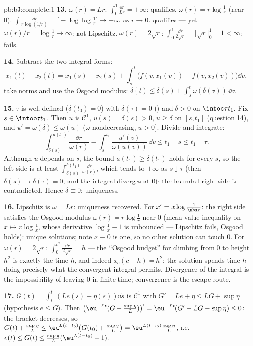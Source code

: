 \begin{solution}{pb:b3:complete:1}
\textbf{13.} $\omega(r) = Lr$: $\int_0^1\frac{\dd r}{Lr} =
+\infty$: qualifies. $\omega(r) = r\log\frac1r$ (near $0$):
$\int\frac{\dd r}{r\log(1/r)} = \bigl[-\log\log\frac1r\bigr]
\to +\infty$ as $r \to 0$: qualifies --- yet $\omega(r)/r =
\log\frac1r \to \infty$: not Lipschitz. $\omega(r) = 2\sqrt
r$: $\int_0^1\frac{\dd r}{2\sqrt r} = \bigl[\sqrt r\bigr]_0^1
= 1 < \infty$: fails.

\textbf{14.} Subtract the two integral forms:
\[
x_1(t) - x_2(t) = x_1(s) - x_2(s) + \int_s^t\bigl(f(v,
x_1(v)) - f(v, x_2(v))\bigr)\dd v,
\]
take norms and use the Osgood modulus: $\delta(t) \leq
\delta(s) + \int_s^t\omega(\delta(v))\,\dd v$.

\textbf{15.} $\tau$ is well defined ($\delta(t_0) = 0$) with
$\delta(\tau) = 0$ () and $\delta > 0$ on
$\intoc\tau{t_1}$. Fix $s \in \intoo\tau{t_1}$. Then $u$ is
$\mathcal C^1$, $u(s) = \delta(s) > 0$, $u \geq \delta$ on
$[s, t_1]$ (question 14), and $u' = \omega(\delta) \leq
\omega(u)$ ($\omega$ nondecreasing, $u > 0$). Divide and
integrate:
\[
\int_{\delta(s)}^{u(t_1)}\frac{\dd r}{\omega(r)}
= \int_s^{t_1}\frac{u'(v)}{\omega(u(v))}\,\dd v \leq t_1 - s
\leq t_1 - \tau .
\]
Although $u$ depends on $s$, the bound $u(t_1) \geq
\delta(t_1)$ holds for every $s$, so the left side is at
least $\int_{\delta(s)}^{\delta(t_1)}\frac{\dd r}{\omega(r)}$,
which tends to $+\infty$ as $s \downarrow \tau$ (then
$\delta(s) \to \delta(\tau) = 0$, and the integral diverges
at $0$): the bounded right side is contradicted. Hence
$\delta \equiv 0$: uniqueness.

\textbf{16.} Lipschitz is $\omega = Lr$: uniqueness recovered.
For $x' = x\log\frac1{\abs x}$: the right side satisfies the
Osgood modulus $\omega(r) = r\log\frac1r$ near $0$ (mean value
inequality on $x \mapsto x\log\frac1x$, whose derivative
$\log\frac1x - 1$ is unbounded --- Lipschitz fails, Osgood
holds): unique solutions; note $x \equiv 0$ is one, so no
other solution can touch $0$. For $\omega(r) = 2\sqrt r$:
$\int_0^{h^2}\frac{\dd r}{2\sqrt r} = h$ --- the ``Osgood
budget'' for climbing from $0$ to height $h^2$ is exactly the
time $h$, and indeed $x_c(c + h) = h^2$: the solution spends
time $h$ doing precisely what the convergent integral
permits. Divergence of the integral is the impossibility of
leaving $0$ in finite time; convergence is the escape route.

\textbf{17.} $G(t) = \int_{t_0}^t(Le(s) + \eta(s))\dd s$ is
$\mathcal C^1$ with $G' = Le + \eta \leq LG + \sup\eta$
(hypothesis $e \leq G$). Then $\bigl(\eu^{-Lt}(G +
\tfrac{\sup\eta}L)\bigr)' = \eu^{-Lt}(G' - LG - \sup\eta)
\leq 0$: the bracket decreases, so $G(t) + \frac{\sup\eta}L
\leq \eu^{L(t - t_0)}\bigl(G(t_0) + \frac{\sup\eta}L\bigr) =
\eu^{L(t-t_0)}\frac{\sup\eta}L$, i.e.\ $e(t) \leq G(t) \leq
\frac{\sup\eta}L(\eu^{L(t-t_0)} - 1)$.


\end{solution}
